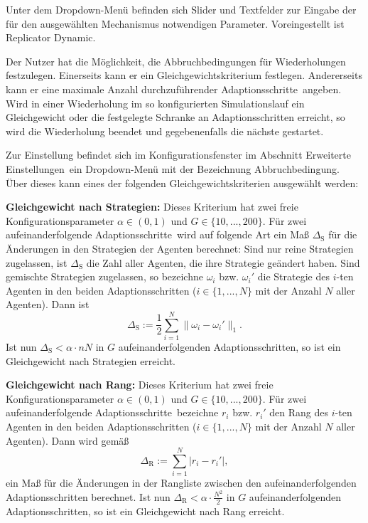\documentclass[parskip=full,11pt,twoside]{scrartcl}
\def\adapts{Adaptionsschritte}
\begin{document}
Unter dem Dropdown-Menü befinden sich Slider und Textfelder zur Eingabe der für den ausgewählten Mechanismus notwendigen Parameter. Voreingestellt ist \glqq Replicator Dynamic\grqq.

Der Nutzer hat die Möglichkeit, die Abbruchbedingungen für Wiederholungen festzulegen. Einerseits kann er ein Gleichgewichtskriterium festlegen. Andererseits kann er eine maximale Anzahl durchzuführender \adapts\ angeben. Wird in einer Wiederholung im so konfigurierten Simulationslauf ein Gleichgewicht oder die festgelegte Schranke an \adapts n erreicht, so wird die Wiederholung beendet und gegebenenfalls die nächste gestartet.

Zur Einstellung befindet sich im Konfigurationsfenster im Abschnitt \glqq Erweiterte Einstellungen\grqq\ ein Dropdown-Menü mit der Bezeichnung \glqq Abbruchbedingung\grqq. Über dieses kann eines der folgenden Gleichgewichtskriterien ausgewählt werden:

\textbf{Gleichgewicht nach Strategien:}
Dieses Kriterium hat zwei freie Konfigurationsparameter \(\alpha \in (0,1)\) und \(G \in \{10,...,200\}\). Für zwei aufeinanderfolgende \adapts\ wird auf folgende Art ein Maß \(\Delta_\text{S}\) für die Änderungen in den Strategien der Agenten berechnet: Sind nur reine Strategien zugelassen, ist \(\Delta_\text{S}\)  die Zahl aller Agenten, die ihre Strategie geändert haben. Sind gemischte Strategien zugelassen, so bezeichne \(\omega_i\) bzw. \(\omega_i'\) die Strategie des \(i\)-ten Agenten in den beiden \adapts n (\(i \in \{1,...,N\}\) mit der Anzahl \(N\) aller Agenten). Dann ist
\[
\Delta_\text{S} :=\frac 12 \sum_{i=1}^N \|\omega_i - \omega_i'\|_1.
\]
Ist nun \(\Delta_\text{S} < \alpha \cdot nN\) in \(G\) aufeinanderfolgenden \adapts n, so ist ein Gleichgewicht nach Strategien erreicht.

\textbf{Gleichgewicht nach Rang:}
Dieses Kriterium hat zwei freie Konfigurationsparameter \(\alpha \in (0,1)\) und \(G \in \{10,...,200\}\). Für zwei aufeinanderfolgende \adapts\ bezeichne \(r_i\) bzw. \(r_i'\) den Rang des \(i\)-ten Agenten in den beiden \adapts n (\(i \in \{1,...,N\}\) mit der Anzahl \(N\) aller Agenten). Dann wird gemäß
\[
\Delta_\text{R} := \sum_{i=1}^N |r_i - r_i'|,
\]
ein Maß für die Änderungen in der Rangliste zwischen den aufeinanderfolgenden \adapts n berechnet. Ist nun \(\Delta_\text{R} < \alpha \cdot \frac{N^2}{2}\) in \(G\) aufeinanderfolgenden \adapts n, so ist ein Gleichgewicht nach Rang erreicht.
\end{document}
